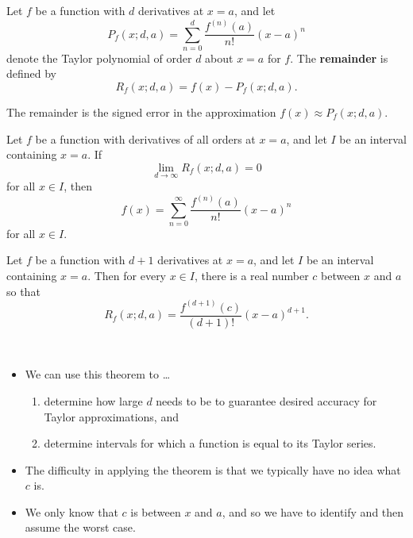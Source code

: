 \setcounter{chapter}{10}
\setcounter{section}{9}
\setcounter{theorem}{0}
\setcounter{equation}{0}


\begin{definition}
Let $f$ be a function with $d$ derivatives at $x=a$, and let 
\begin{equation*}
P_f(x; d, a) = \sum_{n=0}^d\frac{f^{(n)}(a)}{n!}(x-a)^n
\end{equation*}
denote the Taylor polynomial of order $d$ about $x=a$ for $f$.
The \textbf{remainder} is defined by
\begin{equation*}
R_f(x;d,a) = f(x) - P_f(x;d,a).
\end{equation*}
\end{definition}

\begin{remark}
The remainder is the signed error in the approximation $f(x)\approx P_f(x;d,a)$.
\end{remark}

\begin{theorem}
Let $f$ be a function with derivatives of all orders at $x=a$, and let $I$ be an interval containing $x=a$.
If
\begin{equation*}
\lim_{d\to\infty}R_f(x; d, a) = 0
\end{equation*}
for all $x\in I$, then
\begin{equation*}
f(x) = \sum_{n=0}^\infty \frac{f^{(n)}(a)}{n!}(x-a)^n
\end{equation*}
for all $x\in I$.
\end{theorem}

\begin{theorem}
Let $f$ be a function with $d+1$ derivatives at $x=a$, and let $I$ be an interval containing $x=a$.
Then for every $x\in I$, there is a real number $c$ between $x$ and $a$ so that
\begin{equation*}
R_f(x;d,a) = \frac{f^{(d+1)}(c)}{(d+1)!}(x-a)^{d+1}.
\end{equation*}
\end{theorem}

\begin{remark}\,
\begin{itemize}
\item We can use this theorem to \dots
\begin{enumerate}
\item determine how large $d$ needs to be to guarantee desired accuracy for Taylor approximations, and
\item determine intervals for which a function is equal to its Taylor series.
\end{enumerate}
\item The difficulty in applying the theorem is that we typically have no idea what $c$ is.
\item We only know that $c$ is between $x$ and $a$, and so we have to identify and then assume the worst case.
\end{itemize}
\end{remark}

